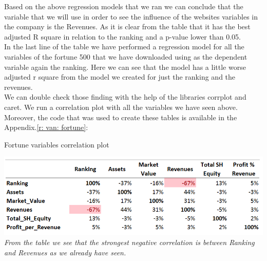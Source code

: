 \documentclass{book}
\begin{document}
Based on the above regression models that we ran we can conclude that the variable that we will use in order to see the influence of the websites variables in the company is the Revenues. As it is clear from the table that it has the best adjusted R square in relation to the ranking and a p-value lower than 0.05.\\
In the last line of the table we have performed a regression model for all the variables of the fortune 500 that we have downloaded using as the dependent variable again the ranking. Here we can see that the model has a little worse adjusted r square from the model we created for just the ranking and the revenues.\\
We can double check those finding with the help of the libraries corrplot and caret. We run a correlation plot with all the variables we have seen above. Moreover, the code that was used to create these tables is available in the Appendix.\ref{r: van: fortune}:
\begin{table}[H]
\centering
\caption{Fortune variables correlation plot}
\begin{center}
\includegraphics[scale=0.5]{../R/photos/09_rank_corplot_f500.png}   \\
\textit{From the table we see that the strongest negative correlation is between Ranking and Revenues as we already have seen.}
\end{center}
\end{table}
\newpage
\end{document}
